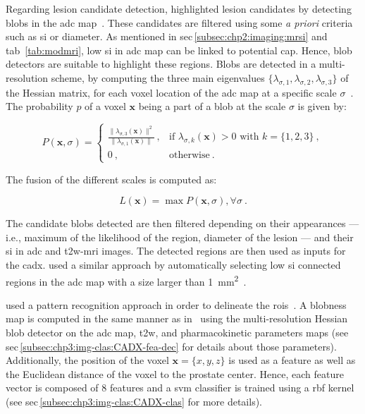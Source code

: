 Regarding lesion candidate detection, \citeauthor{Vos2012} highlighted lesion
candidates by detecting blobs in the \ac{adc} map~\cite{Vos2012}.
These candidates are filtered using some \textit{a priori} criteria such as
\ac{si} or diameter.
As mentioned in \acs{sec}\,\ref{subsec:chp2:imaging:mrsi} and
\acs{tab}~\ref{tab:modmri}, low \ac{si} in \ac{adc} map can be linked to
potential \ac{cap}.
Hence, blob detectors are suitable to highlight these regions.
Blobs are detected in a multi-resolution scheme, by computing the three main
eigenvalues $\{ \lambda_{\sigma,1},\lambda_{\sigma,2},\lambda_{\sigma,3} \}$ of
the Hessian matrix, for each voxel location of the \ac{adc} map at a specific
scale $\sigma$~\cite{Li2003}.
The probability $p$ of a voxel $\mathbf{x}$ being a part of a blob at the scale
$\sigma$ is given by:

\begin{equation}
  P(\mathbf{x},\sigma) = \begin{cases}
    \frac{\| \lambda_{\sigma,3}(\mathbf{x}) \|^{2}}{\| \lambda_{\sigma,1}
      (\mathbf{x}) \|} \ , & \text{if } \lambda_{\sigma,k}(\mathbf{x}) > 0
    \text{ with } k = \{1,2,3\} \  , \\
    0 \ , & \text{otherwise} \ .
  \end{cases}
  \label{eq:blobdet}
\end{equation}

\noindent The fusion of the different scales is computed as:

\begin{equation}
  L(\mathbf{x}) = \max P(\mathbf{x},\sigma) , \forall \sigma \ .
  \label{eq:fusionBlob}
\end{equation}

The candidate blobs detected are then filtered depending on their appearances
--- i.e., maximum of the likelihood of the region, diameter of the lesion ---
and their \ac{si} in \ac{adc} and \ac{t2w}-\ac{mri} images.
The detected regions are then used as inputs for the \ac{cadx}.
\citeauthor{cameron2016maps} used a similar approach by automatically selecting
low \ac{si} connected regions in the \ac{adc} map with a size larger than
\SI{1}{\milli\metre\squared}~\cite{cameron2014multiparametric,cameron2016maps}.

\citeauthor{Litjens2011} used a pattern recognition approach in order to
delineate the \acp{roi}~\cite{Litjens2011}.
A blobness map is computed in the same manner as in~\cite{Vos2010} using the
multi-resolution Hessian blob detector on the \ac{adc} map, \ac{t2w}, and
pharmacokinetic parameters maps (see
\acs{sec}\,\ref{subsec:chp3:img-clas:CADX-fea-dec} for details about those
parameters).
Additionally, the position of the voxel $\mathbf{x}=\{x,y,z\}$ is used as a
feature as well as the Euclidean distance of the voxel to the prostate center.
Hence, each feature vector is composed of 8 features and a \ac{svm} classifier
is trained using a \ac{rbf} kernel (see
\acs{sec}\,\ref{subsec:chp3:img-clas:CADX-clas} for more details).

